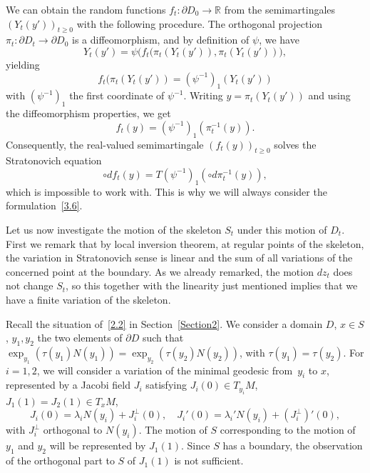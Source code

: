 \documentclass[JEP,XML,SOM,Unicode,NoFloatCountersInSection,published]{cedram}
\theoremstyle{plain}
\theoremstyle{definition}
\newcommand{\RR}{{\mathbb R}}
\let\l\lambda
\begin{document}
We can obtain the random functions $f_t:\partial D_0\to \RR$ from the semimartingales $(Y_t(y'))_{t\ge 0}$ with the following procedure. The orthogonal projection $\pi_t: \partial D_t\to \partial D_0$ is a diffeomorphism, and by definition of $\psi$, we have
\begin{equation}
Y_t(y')=\psi \bigl(f_t(\pi_t(Y_t(y')),\pi_t(Y_t(y'))\bigr),
\end{equation}
yielding
\begin{equation}
f_t(\pi_t(Y_t(y'))=\left(\psi^{-1}\right)_1(Y_t(y'))
\end{equation}
with $\left(\psi^{-1}\right)_1$ the first coordinate of $\psi^{-1}$.
Writing $y=\pi_t(Y_t(y'))$ and using the diffeomorphism properties, we get
\begin{equation}
f_t(y)=\left(\psi^{-1}\right)_1(\pi_t^{-1}(y)).
\end{equation}
Consequently, the real-valued semimartingale $(f_t(y))_{t\ge 0}$ solves the Stratonovich equation
\begin{equation}
\circ df_t(y)=T\left(\psi^{-1}\right)_1(\circ d\pi_t^{-1}(y)),
\end{equation}
which is impossible to work with. This is why we will always consider the formulation~\eqref{3.6}.

Let us now investigate the motion of the skeleton $S_t$ under this motion of $D_t$. First we remark that by local inversion theorem, at regular points of the skeleton, the variation {in Stratonovich sense} is linear and the sum of all variations
of the concerned point at the boundary.
As we already remarked, the motion $dz_t$ does not change $S_t${, so this together with the linearity just mentioned implies that we have a finite variation of the skeleton}.

Recall the situation of~\eqref{2.2} in Section~\ref{Section2}. We consider a domain $D$, $x\in S$, $y_1,y_2$ the two elements of $\partial D$ such that $\exp_{y_1}\left(\tau(y_1)N(y_1)\right)=\exp_{y_2}\left(\tau(y_2)N(y_2)\right)$, with $\tau(y_1)=\tau(y_2)$.
For $i=1,2$, we will consider a variation of the minimal geodesic from~$y_i$ to $x$, represented by a Jacobi field $J_i$ satisfying $J_i(0)\in T_{y_i}M$, $J_1(1)=J_2(1)\in T_xM$,
\begin{equation}
J_i(0)=\l_i N(y_i)+J_i^\perp(0), \quad J_i'(0)=\l_i'N(y_i)+(J_i^\perp)'(0),
\end{equation}
with $J_i^\perp$ orthogonal to $N(y_i)$. The motion of $S$ corresponding to the motion of $y_1$ and $y_2$ will be represented by $J_1(1)$. Since $S$ has a boundary, the observation of the orthogonal part {to $S$ of $J_1(1)$} is not sufficient.
\end{document}
